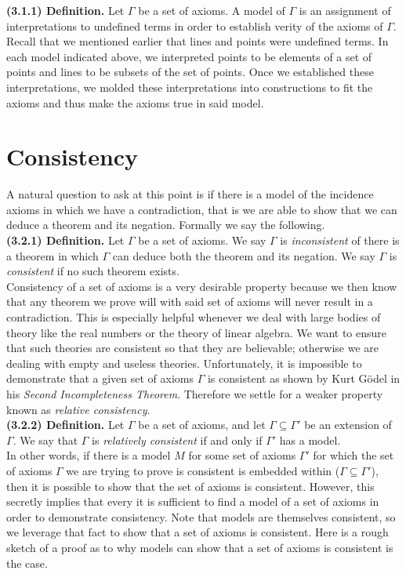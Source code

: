 \documentclass[12pt]{book}
\def\header #1{\noindent\textbf{#1}}
\begin{document}
\header{(3.1.1) Definition.} Let $\Gamma$ be a set of axioms. A model of $\Gamma$ is an assignment of interpretations to undefined terms in order to establish verity of the axioms of $\Gamma$.\\

Recall that we mentioned earlier that lines and points were undefined terms. In each model indicated above, we interpreted points to be elements of a set of points and lines to be subsets of the set of points. Once we established these interpretations, we molded these interpretations into constructions to fit the axioms and thus make the axioms true in said model. 

\section{Consistency}
	A natural question to ask at this point is if there is a model of the incidence axioms in which we have a contradiction, that is we are able to show that we can deduce a theorem and its negation. Formally we say the following.\\
	
\header{(3.2.1) Definition.} Let $\Gamma$ be a set of axioms. We say $\Gamma$ is \textit{inconsistent} of there is a theorem in which $\Gamma$ can deduce both the theorem and its negation. We say $\Gamma$ is \textit{consistent} if no such theorem exists.\\
	
Consistency of a set of axioms is a very desirable property because we then know that any theorem we prove will with said set of axioms will never result in a contradiction. This is especially helpful whenever we deal with large bodies of theory like the real numbers or the theory of linear algebra. We want to ensure that such theories are consistent so that they are believable; otherwise we are dealing with empty and useless theories. Unfortunately, it is impossible to demonstrate that a given set of axioms $\Gamma$ is consistent as shown by Kurt G{\"o}del in his \textit{Second Incompleteness Theorem}. Therefore we settle for a weaker property known as \textit{relative consistency}.\\

\header{(3.2.2) Definition.} Let $\Gamma$ be a set of axioms, and let $\Gamma\subseteq\Gamma'$ be an extension of $\Gamma$. We say that $\Gamma$ is \textit{relatively consistent} if and only if $\Gamma'$ has a model.\\

In other words, if there is a model $M$ for some set of axioms $\Gamma'$ for which the set of axioms $\Gamma$ we are trying to prove is consistent is embedded within ($\Gamma\subseteq\Gamma'$), then it is possible to show that the set of axioms is consistent. However, this secretly implies that every it is sufficient to find a model of a set of axioms in order to demonstrate consistency. Note that models are themselves consistent, so we leverage that fact to show that a set of axioms is consistent. Here is a rough sketch of a proof as to why models can show that a set of axioms is consistent is the case.\\
\end{document}
